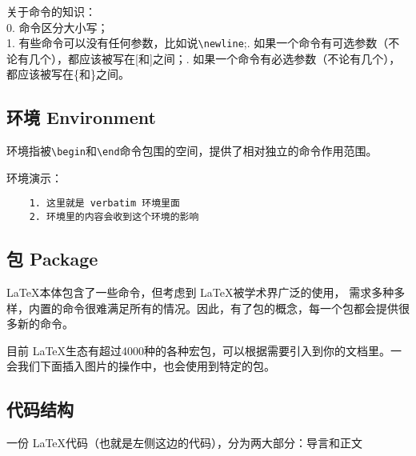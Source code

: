 关于命令的知识：\\
0. 命令区分大小写； \\
1. 有些命令可以没有任何参数，比如说\verb|\newline|;. 如果一个命令有可选参数（不论有几个），都应该被写在[和]之间；. 如果一个命令有必选参数（不论有几个），都应该被写在\{和\}之间。\newline




\subsection{环境 Environment} 
环境指被\verb=\begin=和\verb=\end=命令包围的空间，提供了相对独立的命令作用范围。

环境演示：
\begin{verbatim}
    1. 这里就是 verbatim 环境里面
    2. 环境里的内容会收到这个环境的影响
\end{verbatim}

\subsection{包 Package}
\LaTeX 本体包含了一些命令，但考虑到 \LaTeX 被学术界广泛的使用， 需求多种多样，内置的命令很难满足所有的情况。因此，有了包的概念，每一个包都会提供很多新的命令。

目前 \LaTeX 生态有超过4000种的各种宏包，可以根据需要引入到你的文档里。一会我们下面插入图片的操作中，也会使用到特定的包。


\subsection{代码结构}
一份 \LaTeX 代码（也就是左侧这边的代码），分为两大部分：导言和正文


